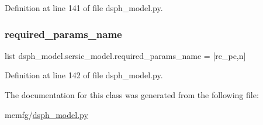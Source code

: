 Definition at line 141 of file dsph\+\_\+model.\+py.

\mbox{\label{classdsph__model_1_1sersic__model_a19d71ba6a9b6df68453b7bbdfd8c8022}} 
\subsubsection{\texorpdfstring{required\+\_\+params\+\_\+name}{required\_params\_name}}
{\footnotesize\ttfamily list dsph\+\_\+model.\+sersic\+\_\+model.\+required\+\_\+params\+\_\+name = \mbox{[}\textquotesingle{}re\+\_\+pc\textquotesingle{},\textquotesingle{}n\textquotesingle{}\mbox{]}\hspace{0.3cm}{\ttfamily [static]}}



Definition at line 142 of file dsph\+\_\+model.\+py.



The documentation for this class was generated from the following file\+:\begin{DoxyCompactItemize}
\item 
memfg/\hyperlink{dsph__model_8py}{dsph\+\_\+model.\+py}\end{DoxyCompactItemize}
